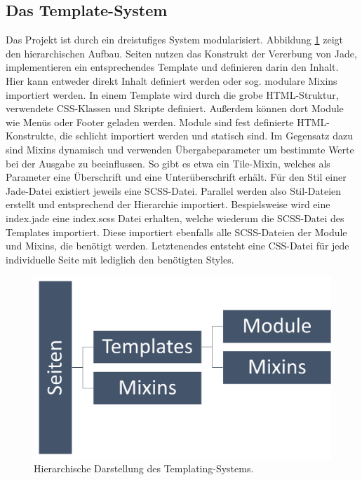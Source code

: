 \subsection{Das Template-System}
Das Projekt ist durch ein dreistufiges System modularisiert. Abbildung \ref{pre:system} zeigt den hierarchischen Aufbau. Seiten nutzen das Konstrukt der Vererbung von Jade, implementieren ein entsprechendes Template und definieren darin den Inhalt. Hier kann entweder direkt Inhalt definiert werden oder sog. modulare Mixins importiert werden.
In einem Template wird durch die grobe HTML-Struktur, verwendete CSS-Klassen und Skripte definiert. Außerdem können dort Module wie Menüs oder Footer geladen werden.
Module sind fest definierte HTML-Konstrukte, die schlicht importiert werden und statisch sind.
Im Gegensatz dazu sind Mixins dynamisch und verwenden Übergabeparameter um bestimmte Werte bei der Ausgabe zu beeinflussen. So gibt es etwa ein Tile-Mixin, welches als Parameter eine Überschrift und eine Unterüberschrift erhält.
Für den Stil einer Jade-Datei existiert jeweils eine SCSS-Datei. Parallel werden also Stil-Dateien erstellt und entsprechend der Hierarchie importiert. Bespielsweise wird eine index.jade eine index.scss Datei erhalten, welche wiederum die SCSS-Datei des Templates importiert. Diese importiert ebenfalls alle SCSS-Dateien der Module und Mixins, die benötigt werden.
Letztenendes entsteht eine CSS-Datei für jede individuelle Seite mit lediglich den benötigten Styles.

\begin{figure} [tp]
	\includegraphics[width=\textwidth]{./img/pre_system.png}
	\caption{Hierarchische Darstellung des Templating-Systems.}
	\label{pre:system}
\end{figure}